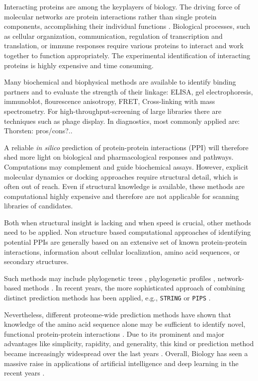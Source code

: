 \documentclass[preprint,3p,times,twocolumn]{elsarticle}
\newcommand{\TODO}[1] {\begingroup\color{red}#1\endgroup}
\begin{document}
Interacting proteins are among the keyplayers of biology. The driving
force of molecular networks are protein interactions rather than
single protein components, accomplishing their individual functions
\cite{Pawson:2004}. Biological processes, such as cellular
organization, communication, regulation of transcription and
translation, or immune responses require various proteins to interact
and work together to function appropriately. The experimental
identification of interacting proteins is highly expensive and time
consuming.

Many biochemical and biophysical methods are available to identify
binding partners and to evaluate the strength of their linkage: ELISA,
gel electrophoresis, immunoblot, flourescence anisotropy, FRET,
Cross-linking with mass spectrometry. For high-throughput-screening of
large libraries there are techniques such as phage display. In
diagnostics, most commonly applied are: \TODO{Thorsten: pros/cons?..}

A reliable \textit{in silico} prediction of protein-protein
interactions (PPI) will therefore shed more light on biological and
pharmacological responses and pathways. Computations may complement
and guide biochemical assays. However, explicit molecular dynamics or
docking approaches require structural detail, which is often out of
reach. Even if structural knowledge is available, these methods are
computational highly expensive and therefore are not applicable for
scanning libraries of candidates. 

Both when structural insight is lacking and when speed is crucial,
other methods need to be applied. Non structure based computational
approaches of identifying potential PPIs are generally based on an
extensive set of known protein-protein interactions, information about
cellular localization, amino acid sequences, or secondary structures.

Such methods may include phylogenetic trees \cite{Pazos:2001},
phylogenetic profiles \cite{Barker:2005}, network-based methods
\cite{Yook:2004, Clauset:2008}. In recent years, the more
sophisticated approach of combining distinct prediction methods has
been applied, e.g., \texttt{STRING} \cite{Szklarczyk:2011} or
\texttt{PIPS} \cite{McDowall:2009}.

Nevertheless, different proteome-wide prediction methods have shown
that knowledge of the amino acid sequence alone may be sufficient to
identify novel, functional protein-protein interactions
\cite{Martin:2005, Shen:2007}. Due to its prominent and major
advantages like simplicity, rapidity, and generality, this kind or
prediction method became increasingly widespread over the last years
\cite{Ofran:2003, Betel:2007, Liu:2012, Perovic:2017,
  Pan:2010}. Overall, Biology has seen a massive raise in applications
of artificial intelligence and deep learning in the recent years
\cite{Ching:2018}.
\end{document}
